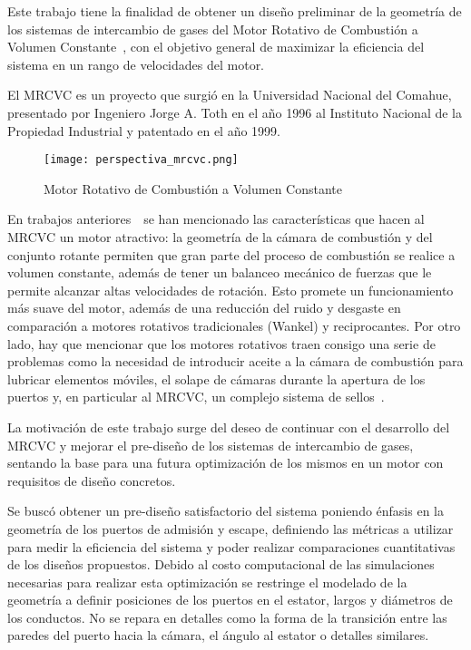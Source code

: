 Este trabajo tiene la finalidad de obtener un diseño preliminar de la geometría
de los sistemas de intercambio de gases del Motor Rotativo de Combustión a
Volumen Constante~\parencite{toth}, con el objetivo general de maximizar la
eficiencia del sistema en un rango de velocidades del motor.
%

El MRCVC es un proyecto que surgió en la Universidad Nacional del Comahue,
presentado por Ingeniero Jorge A. Toth en el año 1996 al Instituto Nacional de
la Propiedad Industrial y patentado en el año 1999.

\begin{figure}
    \centering
    \texttt{[image: perspectiva\_mrcvc.png]}
    \caption{Motor Rotativo de Combustión a Volumen Constante}\label{fig:mrcvc}
\end{figure}

En trabajos anteriores~\parencite{lopez16,lopez13,toth}~se han mencionado
las características que hacen al MRCVC un motor atractivo: la geometría de la
cámara de combustión y del conjunto rotante permiten que gran parte del proceso
de combustión se realice a volumen constante, además de tener un balanceo
mecánico de fuerzas que le permite alcanzar altas velocidades de rotación.
%
Esto promete un funcionamiento más suave del motor, además de una reducción del
ruido y desgaste en comparación a motores rotativos tradicionales (Wankel) y
reciprocantes.
%
Por otro lado, hay que mencionar que los motores rotativos traen consigo una
serie de problemas como la necesidad de introducir aceite a la cámara de
combustión para lubricar elementos móviles, el solape de cámaras durante la
apertura de los puertos y, en particular al MRCVC, un complejo sistema de
sellos~\parencite{roldan}.


La motivación de este trabajo surge del deseo de continuar con el desarrollo del
MRCVC y mejorar el pre-diseño de los sistemas de intercambio de gases, sentando
la base para una futura optimización de los mismos en un motor con requisitos de
diseño concretos.


Se buscó obtener un pre-diseño satisfactorio del sistema poniendo énfasis en la
geometría de los puertos de admisión y escape, definiendo las métricas a
utilizar para medir la eficiencia del sistema y poder realizar comparaciones
cuantitativas de los diseños propuestos.
%
%
Debido al costo computacional de las simulaciones necesarias para realizar esta
optimización se restringe el modelado de la geometría a definir posiciones
de los puertos en el estator, largos y diámetros de los conductos.
%
No se repara en detalles como la forma de la transición entre las paredes del
puerto hacia la cámara, el ángulo al estator o detalles similares.

